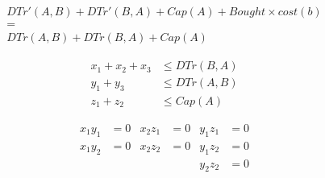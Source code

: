 \begin{gather*}
  DTr'(A,B) + DTr'(B,A) + Cap(A) + Bought \times cost(b) \\ = \\
  DTr(A,B) + DTr(B,A) + Cap(A)
\end{gather*}

\begin{align*}
  x_1 + x_2 + x_3 & \leq DTr(B,A) \\
  y_1 + y_3 & \leq DTr(A,B) \\
  z_1 + z_2 & \leq Cap(A)
\end{align*}

\begin{align*}
  x_1y_1 &= 0 & x_2z_1 &= 0 & y_1z_1 &= 0 \\
  x_1y_2 &= 0 & x_2z_2 &= 0 & y_1z_2 &= 0 \\
          &   &         &   & y_2z_2 &= 0
\end{align*}
